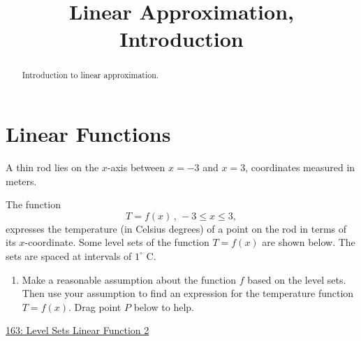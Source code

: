 \documentclass{ximera}
\title{Linear Approximation, Introduction}
\begin{document}
\begin{abstract}
Introduction to linear approximation.
\end{abstract}
\maketitle


\section{Linear Functions}

\begin{question} \label{Q9f93r33}
A thin rod lies on the $x$-axis between $x=-3$ and $x=3$, coordinates measured in meters.

The function 
\[
      T = f(x) \, , \, -3\leq x \leq 3 ,  
\]
expresses the temperature (in Celsius degrees) of a point on the rod in terms of its $x$-coordinate. Some level sets of the function $T=f(x)$ are shown below. The sets are spaced at intervals of $1^\circ$ C.

\begin{enumerate}
\item Make a reasonable assumption about the function $f$ based on the level sets. Then use your assumption to find an expression for the temperature function $T=f(x)$. Drag point $P$ below to help.
\end{enumerate}


\begin{onlineOnly}
    \begin{center}
\end{center}
\end{onlineOnly}

\href{https://www.desmos.com/calculator/tokaicoaz7}{163: Level Sets Linear Function 2}

\end{question}
\end{document}
